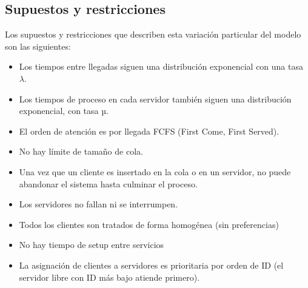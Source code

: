 \documentclass[12pt,a4paper]{article}
\begin{document}
\subsection{Supuestos y restricciones}
Los supuestos y restricciones que describen esta variación particular del modelo son las siguientes:
\begin{itemize}
\item Los tiempos entre llegadas siguen una distribución exponencial con una tasa $\lambda$.
\item Los tiempos de proceso en cada servidor también siguen una distribución exponencial, con tasa µ.
\item El orden de atención es por llegada FCFS (First Come, First Served).
\item No hay límite de tamaño de cola.
\item Una vez que un cliente es insertado en la cola o en un servidor, no puede abandonar el sistema hasta
culminar el proceso.
\item Los servidores no fallan ni se interrumpen.
\item Todos los clientes son tratados de forma homogénea (sin preferencias)
\item No hay tiempo de setup entre servicios
\item La asignación de clientes a servidores es prioritaria por orden de ID (el servidor libre con ID más bajo atiende primero).
\end{itemize}
\end{document}
